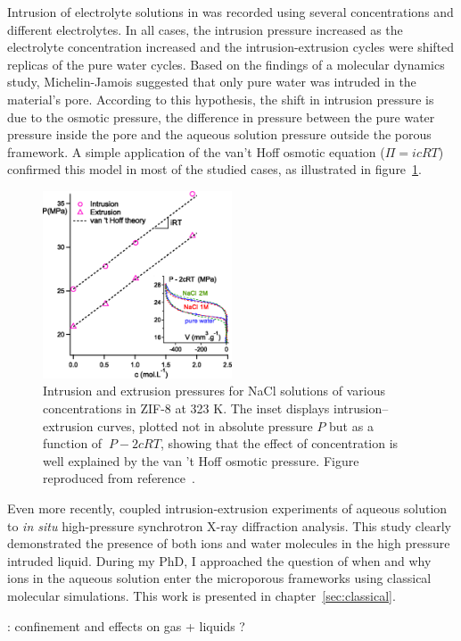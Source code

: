 \documentclass[thesis]{subfiles}
\begin{document}
Intrusion of electrolyte solutions in  was recorded using several
concentrations and different electrolytes\cite{Ortiz2014, MichelinJamois2015}.
In all cases, the intrusion pressure increased as the electrolyte concentration
increased and the intrusion-extrusion cycles were shifted replicas of the pure
water cycles. Based on the findings of a molecular dynamics study\cite{Hu2011},
Michelin-Jamois suggested that only pure water was intruded in the material's
pore. According to this hypothesis, the shift in intrusion pressure is due to
the osmotic pressure, \ie the difference in pressure between the pure water
pressure inside the pore and the aqueous solution pressure outside the porous
framework. A simple application of the van't Hoff osmotic equation ($\Pi = i c R
T$) confirmed this model in most of the studied cases, as illustrated in
figure~\ref{fig:osmotic-zif}.

\begin{figure}[ht]
    \centering
    \includegraphics[width=0.5\textwidth]{figures/cited/osmotic-zif}
    \caption{Intrusion and extrusion pressures for NaCl solutions of
    various concentrations in ZIF-8 at 323 K. The inset displays
    intrusion--extrusion curves, plotted not in absolute pressure $P$ but as a
    function of $\ P - 2cRT$, showing that the effect of concentration is well
    explained by the van 't Hoff osmotic pressure. Figure reproduced from
    reference~\cite{MichelinJamois2015}.}
    \label{fig:osmotic-zif}
\end{figure}

Even more recently, \citeauthor{Arletti2016}\cite{Arletti2016} coupled
intrusion-extrusion experiments of  aqueous solution to \emph{in situ}
high-pressure synchrotron X-ray diffraction analysis. This study clearly
demonstrated the presence of both ions and water molecules in the high pressure
intruded liquid. During my PhD, I approached the question of when and why
ions in the aqueous solution enter the microporous frameworks using classical
molecular simulations. This work is presented in chapter~\ref{sec:classical}.

\TODO: confinement and effects on gas + liquids ?

\OnlyInSubfile{\printglobalbibliography}
\end{document}

